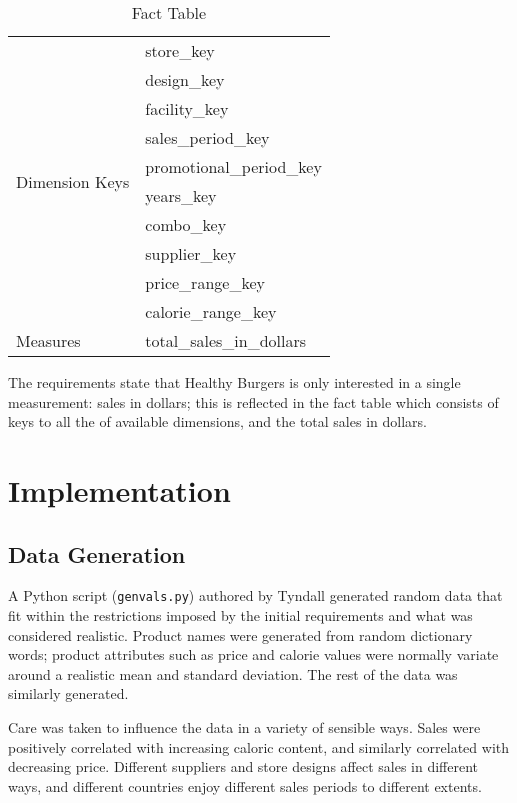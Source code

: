 \documentclass[12pt, a4paper]{article}
\begin{document}
\begin{table}
\begin{tabular}{| l | l |}
\hline
\multirow{10}{3cm}{Dimension Keys} & store\_key \\
	& design\_key \\ 
	& facility\_key \\
	& sales\_period\_key \\
	& promotional\_period\_key \\
	& years\_key \\
	& combo\_key \\
	& supplier\_key \\
	& price\_range\_key \\
	& calorie\_range\_key \\
\hline	

Measures & total\_sales\_in\_dollars \\
\hline

\end{tabular}

\caption{Fact Table}
\label{tab:fact}

\end{table}

The requirements state that Healthy Burgers is only interested in a single measurement: sales in dollars; this is reflected in the fact table which consists of keys to all the of available dimensions, and the total sales in dollars.

\section*{Implementation}

\subsection*{Data Generation}

A Python script (\texttt{genvals.py}) authored by Tyndall generated random data that fit within the restrictions imposed by the initial requirements and what was considered realistic. Product names were generated from random dictionary words; product attributes such as price and calorie values were normally variate around a realistic mean and standard deviation. The rest of the data was similarly generated.

Care was taken to influence the data in a variety of sensible ways. Sales were positively correlated with increasing caloric content, and similarly correlated with decreasing price.
Different suppliers and store designs affect sales in different ways, and different countries enjoy different sales periods to different extents.
\end{document}
